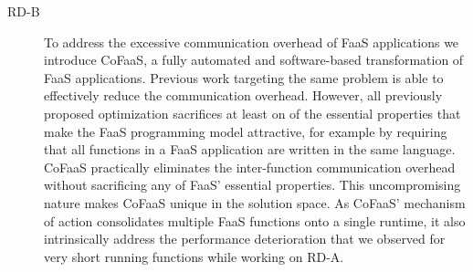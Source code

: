 \documentclass[../main.tex]{subfiles}
\begin{document}
\begin{refsection}
\begin{description}
\item[RD-B] To address the excessive communication overhead of FaaS
  applications we introduce CoFaaS, a fully automated and
  software-based transformation of FaaS applications. Previous work
  targeting the same problem is able to effectively reduce the
  communication overhead. However, all previously proposed
  optimization sacrifices at least on of the essential properties that
  make the FaaS programming model attractive, for example by requiring
  that all functions in a FaaS application are written in the same
  language. CoFaaS practically eliminates the inter-function
  communication overhead without sacrificing any of FaaS' essential
  properties. This uncompromising nature makes CoFaaS unique in the
  solution space. As CoFaaS' mechanism of action consolidates multiple
  FaaS functions onto a single runtime, it also intrinsically address
  the performance deterioration that we observed for very short
  running functions while working on RD-A.

\end{description}




 


\ifx\chapincluded\undefined
  \printbibliography
  \end{refsection}
 \fi
\end{document}
